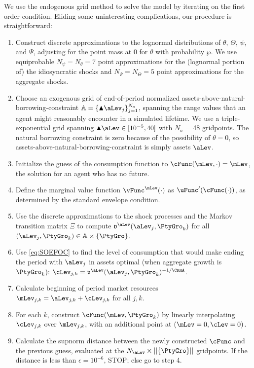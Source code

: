 We use the endogenous grid method to solve the model by iterating
on the first order condition.  Eliding some uninteresting complications, our procedure is straightforward:
\begin{enumerate}
\item Construct discrete approximations to the lognormal distributions of $\theta$, $\Theta$, $\psi$, and $\Psi$,
adjusting for the point mass at 0 for $\theta$ with probability $\wp$.  We use equiprobable $N_\psi = N_\theta = 7$
point approximations for the (lognormal portion of) the idiosyncratic shocks and $N_\Psi = N_\Theta = 5$
point approximations for the aggregate shocks.

\item Choose an exogenous grid of end-of-period normalized assets-above-natural-borrowing-constraint $\mathbb{A} = \{\blacktriangle \aLev_j\}_{j=1}^{N_a}$, spanning
the range values that an agent might reasonably encounter in a simulated lifetime.  We use a triple-exponential grid spanning $\blacktriangle \aLev \in [10^{-5},40]$
with $N_a$ = 48 gridpoints.  The natural borrowing constraint is zero because of the possibility of $\theta=0$, so
 assets-above-natural-borrowing-constraint is simply assets $\aLev$.

\item Initialize the guess of the consumption function to $\cFunc(\mLev,\cdot) = \mLev$, the solution for an agent who has no future.

\item Define the marginal value function $\vFunc^\mLev(\cdot)$ as $\uFunc'(\cFunc(\cdot))$, as determined by the
standard envelope condition.

\item Use the discrete approximations to the shock processes and the Markov transition matrix $\Xi$ to
compute $\mathfrak{v}^\aLev(\aLev_j,\PtyGro_k)$ for all $(\aLev_j,\PtyGro_k) \in \mathbb{A} \times \{\PtyGro\}$.

\item Use \eqref{eq:SOEFOC} to find the level of consumption that would make ending the period
with $\aLev_j$ in assets optimal (when aggregate growth is $\PtyGro_k$): $\cLev_{j,k} = \mathfrak{v}^\aLev(\aLev_j,\PtyGro_k)^{-1/\CRRA}$.

\item Calculate beginning of period market resources $\mLev_{j,k} = \aLev_{j,k}+ \cLev_{j,k}$ for all $j,k$.

\item For each $k$, construct $\cFunc(\mLev,\PtyGro_k)$ by linearly interpolating $\cLev_{j,k}$ over $\mLev_{j,k}$, with
an additional point at $(\mLev=0,\cLev=0)$.

\item Calculate the supnorm distance between the newly constructed $\cFunc$ and the previous guess,
evaluated at the $N_\aLev \times ||\{\PtyGro\} ||$ gridpoints.  If the distance is less than $\epsilon = 10^{-6}$, STOP; else go to step 4.
\end{enumerate}

